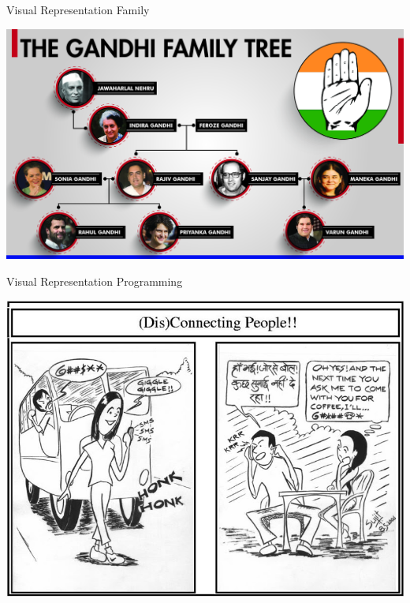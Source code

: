 \documentclass{beamer}
\begin{document}
\begin{frame}[fragile]{Visual Representation}
{Family}
\begin{center}
\includegraphics[width=\textwidth]{images/the_gandhi_family_tree-01.jpg}
\end{center}
\end{frame}

\begin{frame}[fragile]{Visual Representation}
{Programming}
\begin{center}
\includegraphics[width=\textwidth]{images/jun2004.jpg}
\end{center}
\end{frame}
\end{document}
